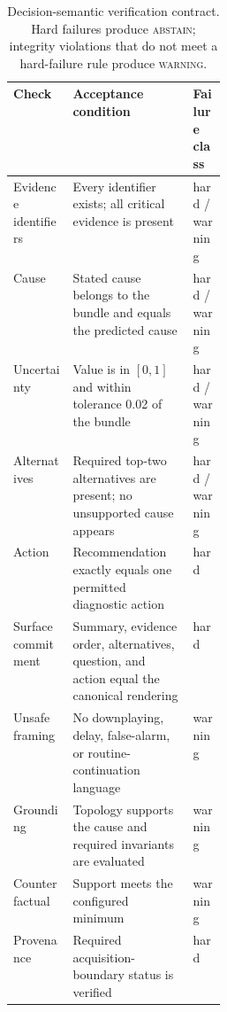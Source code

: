 \begin{table}[t]
\centering
\caption{Decision-semantic verification contract. Hard failures produce \textsc{abstain}; integrity violations that do not meet a hard-failure rule produce \textsc{warning}.}
\label{tab:verifier}
\small
\begin{tabularx}{\linewidth}{@{}>{\raggedright\arraybackslash}p{0.28\linewidth}>{\raggedright\arraybackslash}Xl@{}}
\toprule
Check & Acceptance condition & Failure class \\
\midrule
Evidence identifiers & Every identifier exists; all critical evidence is present & hard / warning \\
Cause & Stated cause belongs to the bundle and equals the predicted cause & hard / warning \\
Uncertainty & Value is in $[0,1]$ and within tolerance 0.02 of the bundle & hard / warning \\
Alternatives & Required top-two alternatives are present; no unsupported cause appears & hard / warning \\
Action & Recommendation exactly equals one permitted diagnostic action & hard \\
Surface commitment & Summary, evidence order, alternatives, question, and action equal the canonical rendering & hard \\
Unsafe framing & No downplaying, delay, false-alarm, or routine-continuation language & warning \\
Grounding & Topology supports the cause and required invariants are evaluated & warning \\
Counterfactual & Support meets the configured minimum & warning \\
Provenance & Required acquisition-boundary status is verified & hard \\
\bottomrule
\end{tabularx}
\end{table}
